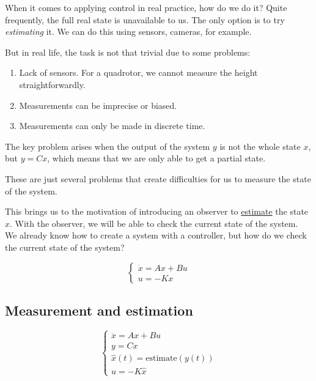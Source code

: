 When it comes to applying control in real practice, how do we do it? Quite frequently, the full real state is unavailable to us. The only option is to try \textit{estimating} it. We can do this using sensors, cameras, for example.

But in real life, the task is not that trivial due to some problems:

\begin{enumerate}
    \item Lack of sensors. For a quadrotor, we cannot measure the height straightforwardly.
    \item Measurements can be imprecise or biased.
    \item Measurements can only be made in discrete time.
\end{enumerate}

The key problem arises when the output of the system \(y\) is not the whole state \(x\), but \(y = Cx\), which means that we are only able to get a partial state.

These are just several problems that create difficulties for us to measure the state of the system.

This brings us to the motivation of introducing an observer to \underline{estimate} the state \(x\). With the observer, we will be able to check the current state of the system. \\

We already know how to create a system with a controller, but how do we check the current state of the system?





\[
\begin{cases}
    \dot x = Ax + Bu\\
    u = -Kx
\end{cases}
\]


\subsection{Measurement and estimation}

\[
\begin{cases}
    \dot x = Ax + Bu \\
    y = Cx \\
    \hat x(t) = \text{estimate}(y(t)) \\
    u = -K \hat x
\end{cases}
\]

